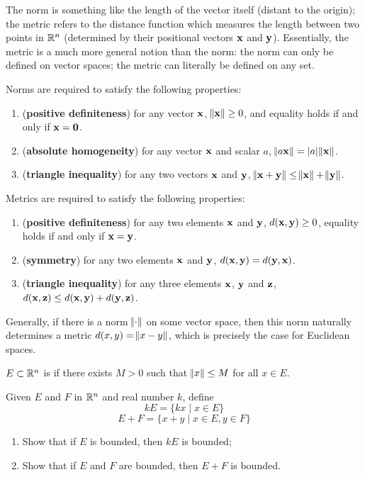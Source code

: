 \begin{remark}
The norm is something like the length of the vector itself (distant to the origin); the metric refers to the distance function which measures the length between two points in $\mathbb R^n$ (determined by their positional vectors $\vb{x}$ and $\vb{y}$). Essentially, the metric is a much more general notion than the norm: the norm can only be defined on vector spaces; the metric can literally be defined on any set.
\end{remark}

Norms are required to satisfy the following properties:
\begin{enumerate}[label=(\arabic*)]
\item (\textbf{positive definiteness}) for any vector $\vb{x}$, $\norm{\vb{x}}\ge0$, and equality holds if and only if $\vb{x}=\vb{0}$.
\item (\textbf{absolute homogeneity}) for any vector $\vb{x}$ and scalar $a$, $\norm{a\vb{x}}=|a|\norm{\vb{x}}$.
\item (\textbf{triangle inequality}) for any two vectors $\vb{x}$ and $\vb{y}$, $\norm{\vb{x}+\vb{y}}\le\norm{\vb{x}}+\norm{\vb{y}}$.
\end{enumerate}

Metrics are required to satisfy the following properties:
\begin{enumerate}[label=(\arabic*)]
\item (\textbf{positive definiteness}) for any two elements $\vb{x}$ and $\vb{y}$, $d(\vb{x},\vb{y})\ge0$, equality holds if and only if $\vb{x}=\vb{y}$.
\item (\textbf{symmetry}) for any two elements $\vb{x}$ and $\vb{y}$, $d(\vb{x},\vb{y})=d(\vb{y},\vb{x})$.
\item (\textbf{triangle inequality}) for any three elements $\vb{x}$, $\vb{y}$ and $\vb{z}$, $d(\vb{x},\vb{z})\le d(\vb{x},\vb{y})+d(\vb{y},\vb{z})$.
\end{enumerate}

Generally, if there is a norm $\norm{\cdot}$ on some vector space, then this norm naturally determines a metric $d(x,y)=\norm{x-y}$, which is precisely the case for Euclidean spaces.

\begin{definition}
$E\subset\mathbb R^n$ is  if there exists $M>0$ such that $\norm{x}\le M$ for all $x\in E$.
\end{definition}

\begin{exercise}
Given $E$ and $F$ in $\mathbb R^n$ and real number $k$, define
\[ kE=\{kx \mid x\in E\} \]
\[ E+F=\{x+y \mid x\in E,y\in F\} \]
\begin{enumerate}[label=(\alph*)]
\item Show that if $E$ is bounded, then $kE$ is bounded;
\item Show that if $E$ and $F$ are bounded, then $E+F$ is bounded.
\end{enumerate}
\end{exercise}

